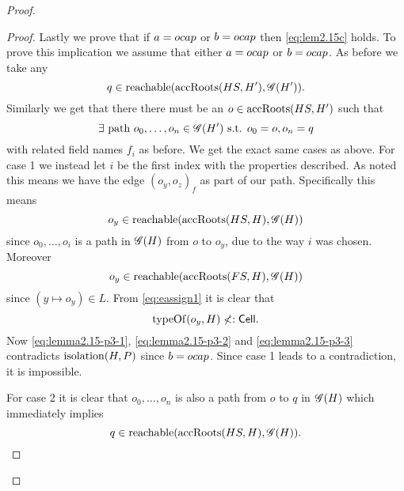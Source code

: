 \begin{proof}
\begin{description}
\begin{description}
\begin{description}
\begin{proof}
                Lastly we prove that if $a = \mbox{$ocap$}$ or $b = \mbox{$ocap$}$ then
                \eqref{eq:lem2.15c} holds. To prove this implication we assume
                that either $a = \mbox{$ocap$}$ or $b = \mbox{$ocap$}$. As before we take any
                \begin{equation}
                  q \in \mbox{$\mathrm{reachable}$}(\mbox{$\mathrm{accRoots}$}(HS, H'), \mathscr{G}(H')).
                \end{equation}
                Similarly we get that there there must be an $o \in
                \mbox{$\mathrm{accRoots}$}(HS, H')$ such that
                \begin{equation}
                  \exists \text{ path } o_0, \dots, o_n \in \mathscr{G}(H') \text{ s.t. } o_0 = o,
                  o_n = q
                \end{equation}
                with related field names $f_i$ as before. We get the exact same
                cases as above. For case 1 we instead let $i$ be the first index with
                the properties described. As noted this means we have the edge
                $(o_y, o_z)_f$ as part of our path. Specifically this means
                \begin{equation}\label{eq:lemma2.15-p3-1}
                  o_y \in \mbox{$\mathrm{reachable}$}(\mbox{$\mathrm{accRoots}$}(HS, H), \mathscr{G}(H))
                \end{equation}
                since $o_0, \dots, o_i$ is a path in $\mathscr{G}(H)$ from $o$ to
                $o_y$, due to the way $i$ was chosen.  Moreover
                \begin{equation}\label{eq:lemma2.15-p3-2}
                  o_y \in \mbox{$\mathrm{reachable}$}(\mbox{$\mathrm{accRoots}$}(FS, H), \mathscr{G}(H))
                \end{equation}
                since $(y \mapsto o_y) \in L$. From \eqref{eq:eassign1} it is clear that
                \begin{equation}\label{eq:lemma2.15-p3-3}
                  \mbox{$\mathrm{typeOf}$}(o_y, H) \not<: \mbox{$\mathsf{Cell}$}.
                \end{equation}
                Now \eqref{eq:lemma2.15-p3-1}, \eqref{eq:lemma2.15-p3-2} and
                \eqref{eq:lemma2.15-p3-3} contradicts $\mbox{$\mathrm{isolation}$}(H, P)$ since $b =
                \mbox{$ocap$}$. Since case 1 leads to a contradiction, it is impossible.
                
                For case 2 it is clear that $o_0, \dots, o_n$ is also a
                path from $o$ to $q$ in $\mathscr{G}(H)$ which immediately implies 
                \begin{equation}
                  q \in \mbox{$\mathrm{reachable}$}(\mbox{$\mathrm{accRoots}$}(HS, H), \mathscr{G}(H)).
                \end{equation}
              \end{proof}


\end{description}
\end{description}
\end{description}
\end{proof}
